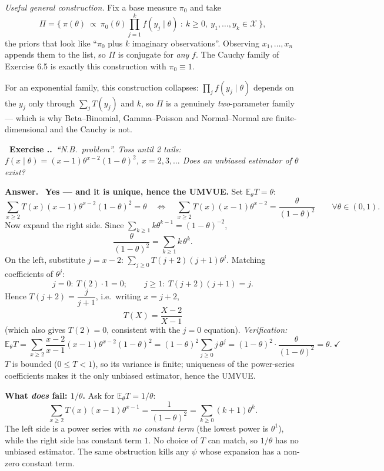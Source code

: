 \documentclass[11pt]{article}
\newcommand{\E}{\mathbb{E}}
\newcounter{exc}[section]
\newenvironment{exc}[1]{\medskip\refstepcounter{exc}%
  \noindent\textbf{\color{ForestGreen}\raisebox{0.5pt}{\scriptsize$\blacksquare$}\ Exercise \thesection.\theexc.}\ \textit{#1}\par\nopagebreak}{\par}
\newcommand{\ans}{\smallskip\noindent\textbf{Answer.}\ }
\begin{document}
\emph{Useful general construction.} Fix a base measure $\pi_0$ and take
\[
\Pi=\Bigg\{\ \pi(\theta)\ \propto\ \pi_0(\theta)\prod_{j=1}^{k}f(y_j\mid\theta)\ :\
k\ge0,\ y_1,\dots,y_k\in\mathcal X\ \Bigg\},
\]
the priors that look like ``$\pi_0$ plus $k$ imaginary observations''. Observing
$x_1,\dots,x_n$ appends them to the list, so $\Pi$ is conjugate for \emph{any} $f$. The
Cauchy family of Exercise 6.5 is exactly this construction with $\pi_0\equiv1$.

For an exponential family, this construction collapses: $\prod_j f(y_j\mid\theta)$ depends on
the $y_j$ only through $\sum_j T(y_j)$ and $k$, so $\Pi$ is a genuinely
\emph{two}-parameter family --- which is why Beta--Binomial, Gamma--Poisson and
Normal--Normal are finite-dimensional and the Cauchy is not.

\begin{exc}{``N.B.\ problem''. Toss until 2 tails:
$f(x\mid\theta)=(x-1)\theta^{x-2}(1-\theta)^{2}$, $x=2,3,\dots$ Does an unbiased estimator of
$\theta$ exist?}
\end{exc}
\ans
\textbf{Yes --- and it is unique, hence the UMVUE.} Set $\E_\theta T=\theta$:
\[
\sum_{x\ge2}T(x)(x-1)\theta^{x-2}(1-\theta)^2=\theta
\quad\Longleftrightarrow\quad
\sum_{x\ge2}T(x)(x-1)\theta^{x-2}=\frac{\theta}{(1-\theta)^2}\qquad\forall\theta\in(0,1).
\]
Now expand the right side. Since $\sum_{k\ge1}k\theta^{k-1}=(1-\theta)^{-2}$,
\[
\frac{\theta}{(1-\theta)^2}=\sum_{k\ge1}k\,\theta^{k}.
\]
On the left, substitute $j=x-2$:
$\sum_{j\ge0}T(j+2)(j+1)\theta^{j}$. Matching coefficients of $\theta^{j}$:
\[
j=0:\ T(2)\cdot1=0;\qquad
j\ge1:\ T(j+2)(j+1)=j .
\]
Hence $T(j+2)=\dfrac{j}{j+1}$, i.e.\ writing $x=j+2$,
\[
\boxed{\ T(X)=\frac{X-2}{X-1}\ }
\]
(which also gives $T(2)=0$, consistent with the $j=0$ equation). \emph{Verification:}
\[
\E_\theta T=\sum_{x\ge2}\frac{x-2}{x-1}(x-1)\theta^{x-2}(1-\theta)^2
=(1-\theta)^2\sum_{j\ge0}j\,\theta^{j}
=(1-\theta)^2\cdot\frac{\theta}{(1-\theta)^2}=\theta.\ \checkmark
\]
$T$ is bounded ($0\le T<1$), so its variance is finite; uniqueness of the power-series
coefficients makes it the only unbiased estimator, hence the UMVUE.

\smallskip
\textbf{What \emph{does} fail: $1/\theta$.} Ask for $\E_\theta T=1/\theta$:
\[
\sum_{x\ge2}T(x)(x-1)\theta^{x-1}=\frac{1}{(1-\theta)^{2}}=\sum_{k\ge0}(k+1)\theta^{k}.
\]
The left side is a power series with \emph{no constant term} (the lowest power is
$\theta^{1}$), while the right side has constant term $1$. No choice of $T$ can match, so
$1/\theta$ has no unbiased estimator. The same obstruction kills any $\psi$ whose expansion
has a non-zero constant term.
\end{document}
